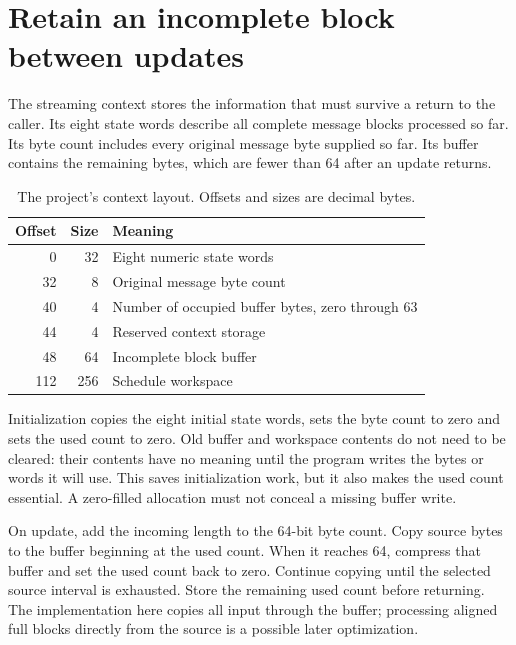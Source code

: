 \section{Retain an incomplete block between updates}
The streaming context stores the information that must survive a return to the caller.
Its eight state words describe all complete message blocks processed so far. Its byte
count includes every original message byte supplied so far. Its buffer contains the
remaining bytes, which are fewer than 64 after an update returns.

\begin{table}[htbp]
  \centering\caption{The project's context layout. Offsets and sizes are decimal bytes.}
  \begin{tabular}{rrl}
    \toprule Offset & Size & Meaning                                          \\\midrule
    0               & 32   & Eight numeric state words                        \\
    32              & 8    & Original message byte count                      \\
    40              & 4    & Number of occupied buffer bytes, zero through 63 \\
    44              & 4    & Reserved context storage                         \\
    48              & 64   & Incomplete block buffer                          \\
    112             & 256  & Schedule workspace                               \\
    \bottomrule
  \end{tabular}
\end{table}

Initialization copies the eight initial state words, sets the byte count to zero and
sets the used count to zero. Old buffer and workspace contents do not need to be
cleared: their contents have no meaning until the program writes the bytes or words it
will use. This saves initialization work, but it also makes the used count essential.
A zero-filled allocation must not conceal a missing buffer write.

On update, add the incoming length to the 64-bit byte count. Copy source bytes to the
buffer beginning at the used count. When it reaches 64, compress that buffer and set
the used count back to zero. Continue copying until the selected source interval is
exhausted. Store the remaining used count before returning. The implementation here
copies all input through the buffer; processing aligned full blocks directly from the
source is a possible later optimization.

